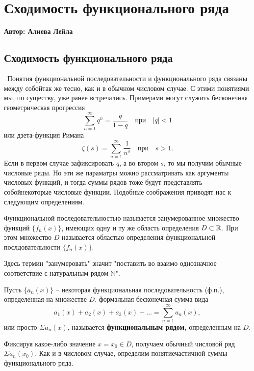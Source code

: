 \setcounter{object}{0}
\setcounter{approval}{0}
\setcounter{theorem}{0}
\setcounter{example}{0}

\chapter{Сходимость функционального ряда}
\centerline{ \bf Автор: Алиева Лейла} \vskip 1cm

\section{Сходимость функционального ряда}
\ Понятия функциональной последовательности и функционального ряда связаны между собойтак же тесно, как и в обычном числовом случае. С этими понятиями мы, по существу, уже ранее встречались. Примерами могут служить бесконечная геометрическая прогрессия
$$\sum^{\infty}_{n=1}q^n=\frac{q}{1-q}\quad\mbox{при}\quad |q|<1 $$
или дзета-функция Римана 
$$\zeta(s)=\sum^{\infty}_{n=1}\frac{1}{n^s}\quad\mbox{при}\quad s>1.$$
Если в первом случае зафиксировать $q$, а во втором $s$, то мы получим обычные числовые ряды. Но эти же параматры можно рассматривать как аргументы числовых функций, и тогда суммы рядов тоже будут представлять собойнекоторые числовые функции. Подобные соображения приводят нас к следующим определениям.\smallskip

\begin{object} Функциональной последовательностью называется занумерованное множество функций $\{ f_n(x) \}$, имеющих одну и ту же область определения $D\subset \mathbb R$. При этом множество $D$ называется областью определения функциональной послдовательности $\{ f_n(x) \}$.\end{object}\smallskip

Здесь термин "занумеровать" значит "поставить во взаимо однозначное соответствие с натуральным рядом $\mathbb{N}$".

\begin{object} Пусть $\{a_n(x)\}$ -- некоторая функциональная последовательность (ф.п.), определенная на множестве $D$. формальная бесконечная сумма вида $$ a_1(x)+a_2(x)+a_3(x)+\ldots=\sum^{\infty}_{n=1}a_n(x),$$ или просто $\Sigma a_n(x)$, называется \textbf{функциональным рядом,} определенным на $D$.\end{object}\smallskip

Фиксируя какое-либо значение $x=x_0\in D$, получаем обычный числовой ряд $\Sigma a_n(x_0)$. Как и в числовом случае, определим понятиечастичной суммы функционального ряда.\smallskip

